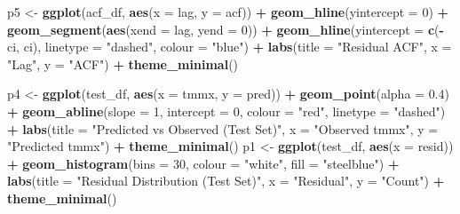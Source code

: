 \documentclass[
]{article}
\newenvironment{Shaded}{\begin{snugshade}}{\end{snugshade}}
\newcommand{\AttributeTok}[1]{\textcolor[rgb]{0.13,0.29,0.53}{#1}}
\newcommand{\DecValTok}[1]{\textcolor[rgb]{0.00,0.00,0.81}{#1}}
\newcommand{\FloatTok}[1]{\textcolor[rgb]{0.00,0.00,0.81}{#1}}
\newcommand{\FunctionTok}[1]{\textcolor[rgb]{0.13,0.29,0.53}{\textbf{#1}}}
\newcommand{\NormalTok}[1]{#1}
\newcommand{\OtherTok}[1]{\textcolor[rgb]{0.56,0.35,0.01}{#1}}
\newcommand{\SpecialCharTok}[1]{\textcolor[rgb]{0.81,0.36,0.00}{\textbf{#1}}}
\newcommand{\StringTok}[1]{\textcolor[rgb]{0.31,0.60,0.02}{#1}}
\begin{document}
\begin{Shaded}
\begin{Highlighting}[]
\NormalTok{p5 }\OtherTok{\textless{}{-}} \FunctionTok{ggplot}\NormalTok{(acf\_df, }\FunctionTok{aes}\NormalTok{(}\AttributeTok{x =}\NormalTok{ lag, }\AttributeTok{y =}\NormalTok{ acf)) }\SpecialCharTok{+}
  \FunctionTok{geom\_hline}\NormalTok{(}\AttributeTok{yintercept =} \DecValTok{0}\NormalTok{) }\SpecialCharTok{+}
  \FunctionTok{geom\_segment}\NormalTok{(}\FunctionTok{aes}\NormalTok{(}\AttributeTok{xend =}\NormalTok{ lag, }\AttributeTok{yend =} \DecValTok{0}\NormalTok{)) }\SpecialCharTok{+}
  \FunctionTok{geom\_hline}\NormalTok{(}\AttributeTok{yintercept =} \FunctionTok{c}\NormalTok{(}\SpecialCharTok{{-}}\NormalTok{ci, ci),}
             \AttributeTok{linetype =} \StringTok{"dashed"}\NormalTok{, }\AttributeTok{colour =} \StringTok{"blue"}\NormalTok{) }\SpecialCharTok{+}
  \FunctionTok{labs}\NormalTok{(}\AttributeTok{title =} \StringTok{"Residual ACF"}\NormalTok{, }\AttributeTok{x =} \StringTok{"Lag"}\NormalTok{, }\AttributeTok{y =} \StringTok{"ACF"}\NormalTok{) }\SpecialCharTok{+}
  \FunctionTok{theme\_minimal}\NormalTok{()}

\NormalTok{p4 }\OtherTok{\textless{}{-}} \FunctionTok{ggplot}\NormalTok{(test\_df, }\FunctionTok{aes}\NormalTok{(}\AttributeTok{x =}\NormalTok{ tmmx, }\AttributeTok{y =}\NormalTok{ pred)) }\SpecialCharTok{+}
  \FunctionTok{geom\_point}\NormalTok{(}\AttributeTok{alpha =} \FloatTok{0.4}\NormalTok{) }\SpecialCharTok{+}
  \FunctionTok{geom\_abline}\NormalTok{(}\AttributeTok{slope =} \DecValTok{1}\NormalTok{, }\AttributeTok{intercept =} \DecValTok{0}\NormalTok{,}
              \AttributeTok{colour =} \StringTok{"red"}\NormalTok{, }\AttributeTok{linetype =} \StringTok{"dashed"}\NormalTok{) }\SpecialCharTok{+}
  \FunctionTok{labs}\NormalTok{(}\AttributeTok{title =} \StringTok{"Predicted vs Observed (Test Set)"}\NormalTok{,}
       \AttributeTok{x =} \StringTok{"Observed tmmx"}\NormalTok{, }\AttributeTok{y =} \StringTok{"Predicted tmmx"}\NormalTok{) }\SpecialCharTok{+}
  \FunctionTok{theme\_minimal}\NormalTok{()}
\NormalTok{p1 }\OtherTok{\textless{}{-}} \FunctionTok{ggplot}\NormalTok{(test\_df, }\FunctionTok{aes}\NormalTok{(}\AttributeTok{x =}\NormalTok{ resid)) }\SpecialCharTok{+}
  \FunctionTok{geom\_histogram}\NormalTok{(}\AttributeTok{bins =} \DecValTok{30}\NormalTok{, }\AttributeTok{colour =} \StringTok{"white"}\NormalTok{, }\AttributeTok{fill =} \StringTok{"steelblue"}\NormalTok{) }\SpecialCharTok{+}
  \FunctionTok{labs}\NormalTok{(}\AttributeTok{title =} \StringTok{"Residual Distribution (Test Set)"}\NormalTok{,}
       \AttributeTok{x =} \StringTok{"Residual"}\NormalTok{, }\AttributeTok{y =} \StringTok{"Count"}\NormalTok{) }\SpecialCharTok{+}
  \FunctionTok{theme\_minimal}\NormalTok{()}


\end{Highlighting}
\end{Shaded}
\end{document}
